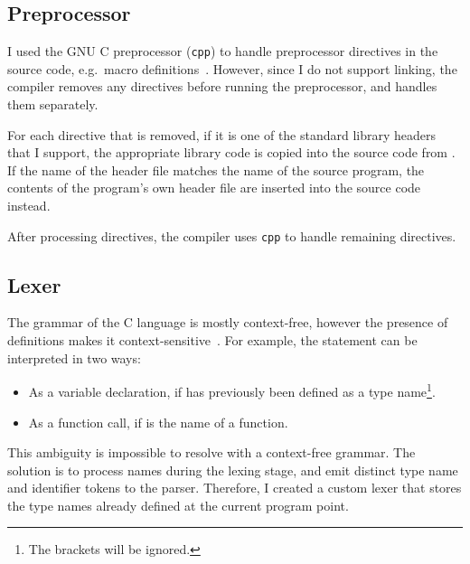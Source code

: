 \documentclass[00-main.tex]{subfiles}
\begin{document}
\subsection{Preprocessor}

I used the GNU C preprocessor (\texttt{cpp}) to handle preprocessor directives in the source code, e.g.~macro definitions~.
However, since I do not support linking, the compiler removes any  directives before running the preprocessor, and handles them separately.

For each  directive that is removed, if it is one of the standard library headers that I support, the appropriate library code is copied into the source code from .
If the name of the header file matches the name of the source program, the contents of the program's own header file are inserted into the source code instead.

After processing  directives, the compiler uses \texttt{cpp} to handle remaining directives.

\subsection{Lexer}\label{sec:impl:lexer}

The grammar of the C language is mostly context-free, however the presence of  definitions makes it context-sensitive~.
For example, the statement  can be interpreted in two ways:
\begin{itemize}[nosep]
\item As a variable declaration, if  has previously been defined as a type name\footnote{The brackets will be ignored.}.
\item As a function call, if  is the name of a function.
\end{itemize}

This ambiguity is impossible to resolve with a context-free grammar. The solution is to process  names during the lexing stage, and emit distinct type name and identifier tokens to the parser.
Therefore, I created a custom lexer that stores the type names already defined at the current program point.
\end{document}

